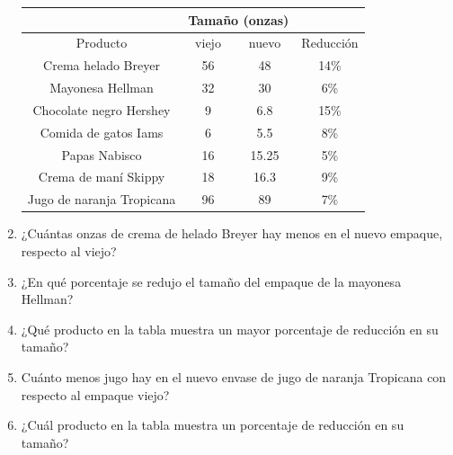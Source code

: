 \documentclass[twoside,letterpaper]{article}
\begin{document}
\begin{multicols}{2}
\begin{enumerate}
\begin{tabular}{|c|c|c|c|}
\hline 
 & \multicolumn{2}{c}{Tamaño (onzas)}  &  \\ 
\hline 
Producto & viejo & nuevo & Reducción\\ 
\hline 
Crema helado Breyer & 56 & 48 & 14\% \\ 
\hline 
Mayonesa Hellman & 32 & 30 & 6\% \\ 
\hline 
Chocolate negro Hershey & 9 & 6.8 & 15\% \\ 
\hline 
Comida de gatos Iams & 6 & 5.5 & 8\% \\ 
\hline 
Papas Nabisco & 16 & 15.25 & 5\% \\ 
\hline 
Crema de maní Skippy & 18 & 16.3 & 9\% \\ 
\hline 
Jugo de naranja Tropicana & 96 & 89 & 7\% \\ 
\hline 
\end{tabular} 
\item ¿Cuántas onzas de crema de helado Breyer hay menos en el nuevo empaque, respecto al viejo?
\item ¿En qué porcentaje se redujo el tamaño del empaque de la mayonesa Hellman?
\item ¿Qué producto en la tabla muestra un mayor porcentaje de reducción en su tamaño?
\item Cuánto menos jugo hay en el nuevo envase de jugo de naranja Tropicana con respecto al empaque viejo?
\item ¿Cuál producto en la tabla muestra un porcentaje de reducción en su tamaño?
\end{enumerate}
\end{multicols}
\end{document}
